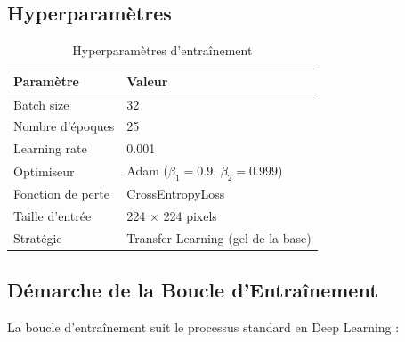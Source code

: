 \documentclass[12pt,a4paper]{report}
\begin{document}
\subsection{Hyperparamètres}
\begin{table}[H]
    \centering
    \caption{Hyperparamètres d'entraînement}
    \label{tab:hyperparams}
    \begin{tabular}{ll}
        \toprule
        \textbf{Paramètre} & \textbf{Valeur} \\
        \midrule
        Batch size & 32 \\
        Nombre d'époques & 25 \\
        Learning rate & 0.001 \\
        Optimiseur & Adam ($\beta_1=0.9$, $\beta_2=0.999$) \\
        Fonction de perte & CrossEntropyLoss \\
        Taille d'entrée & 224 $\times$ 224 pixels \\
        Stratégie & Transfer Learning (gel de la base) \\
        \bottomrule
    \end{tabular}
\end{table}

\subsection{Démarche de la Boucle d'Entraînement}
La boucle d'entraînement suit le processus standard en Deep Learning :
\end{document}
